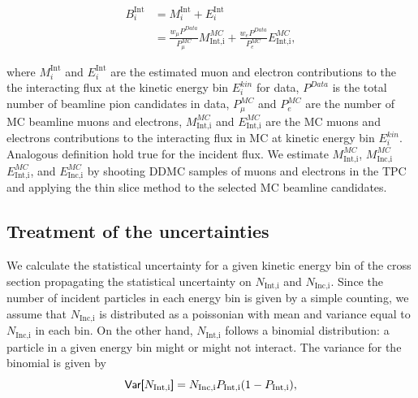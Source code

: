 \documentclass[aps,prl,twocolumn,showpacs,superscriptaddress,groupedaddress]{revtex4}  %
\begin{document}
\begin{equation} \label{eq:Contaminants}
\begin{split}
B^{ \text{Int}}_i & = M^{ \text{Int}}_i + E^{ \text{Int}}_i \\
                         & =  \frac{w_\mu P^{Data}}{P^{MC}_\mu} M^{MC}_{ \text{Int,i}} + \frac{w_e P^{Data}}{P^{MC}_e}E^{MC}_{ \text{Int,i}},
\end{split}
\end{equation}


where $M^{ \text{Int}}_i$ and $E^{ \text{Int}}_i$ are the estimated muon and electron contributions to the the interacting flux at the kinetic energy bin $E^{kin}_i$ for data, $P^{Data}$ is the total number of beamline pion candidates in data, $P^{MC}_\mu$ and $P^{MC}_e$ are the number of MC beamline muons and electrons, $M^{MC}_{ \text{Int,i}}$ and $E^{MC}_{ \text{Int,i}} $ are  the MC muons and electrons contributions to the interacting flux in MC at kinetic energy bin $E^{kin}_i$.\\
Analogous definition hold true for the incident flux. We estimate $M^{MC}_{ \text{Int,i}}$, $M^{MC}_{ \text{Inc,i}}$  $E^{MC}_{ \text{Int,i}} $, and $E^{MC}_{ \text{Inc,i}} $ by shooting  DDMC samples of muons and electrons in the TPC and applying the thin slice method to the selected MC beamline candidates.


\subsection{\label{sec:Corrections}Treatment of the uncertainties}
We calculate the statistical uncertainty for a given kinetic energy bin of the cross section propagating the statistical uncertainty on $N_{\text{Int,i}}$ and $N_{\text{Inc,i}}$.  Since the number of incident particles in each energy bin is given by a simple counting, we assume that $N_{\text{Inc,i}}$ is distributed as a poissonian with mean and variance equal to $N_{\text{Inc,i}}$ in each bin.  
On the other hand, $N_{\text{Int,i}}$ follows a binomial distribution: a particle in a given energy bin might or might not interact.  The variance for the binomial is given by  
\begin{equation}
\text{\textsf{Var[}} N_{\text{Int,i}} \text{\textsf{]}}
 = N_{\text{Inc,i}}P_{\text{Int,i}}(1-P_{\text{Int,i}}),
\label{eq:binVar}
\end{equation}
\end{document}
